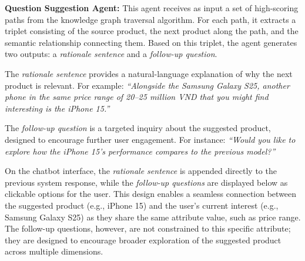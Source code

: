\textbf{Question Suggestion Agent:} This agent receives as input a set of high-scoring paths from the knowledge graph traversal algorithm. For each path, it extracts a triplet consisting of the source product, the next product along the path, and the semantic relationship connecting them. Based on this triplet, the agent generates two outputs: a \textit{rationale sentence} and a \textit{follow-up question}. 

The \textit{rationale sentence} provides a natural-language explanation of why the next product is relevant. For example: \textit{“Alongside the Samsung Galaxy S25, another phone in the same price range of 20–25 million VND that you might find interesting is the iPhone 15.”}

The \textit{follow-up question} is a targeted inquiry about the suggested product, designed to encourage further user engagement. For instance: \textit{“Would you like to explore how the iPhone 15’s performance compares to the previous model?”}


On the chatbot interface, the \textit{rationale sentence} is appended directly to the previous system response, while the \textit{follow-up questions} are displayed below as clickable options for the user. This design enables a seamless connection between the suggested product (e.g., iPhone 15) and the user's current interest (e.g., Samsung Galaxy S25) as they share the same attribute value, such as price range. The follow-up questions, however, are not constrained to this specific attribute; they are designed to encourage broader exploration of the suggested product across multiple dimensions.

